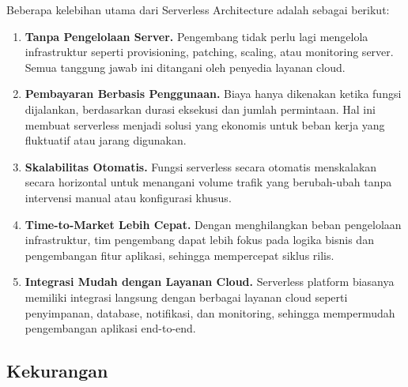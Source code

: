 Beberapa kelebihan utama dari Serverless Architecture adalah sebagai berikut:
\begin{enumerate}
	\item \textbf{Tanpa Pengelolaan Server.} Pengembang tidak perlu lagi mengelola infrastruktur seperti provisioning, patching, scaling, atau monitoring server. Semua tanggung jawab ini ditangani oleh penyedia layanan cloud.
	
	\item \textbf{Pembayaran Berbasis Penggunaan.} Biaya hanya dikenakan ketika fungsi dijalankan, berdasarkan durasi eksekusi dan jumlah permintaan. Hal ini membuat serverless menjadi solusi yang ekonomis untuk beban kerja yang fluktuatif atau jarang digunakan.
	
	\item \textbf{Skalabilitas Otomatis.} Fungsi serverless secara otomatis menskalakan secara horizontal untuk menangani volume trafik yang berubah-ubah tanpa intervensi manual atau konfigurasi khusus.
	
	\item \textbf{Time-to-Market Lebih Cepat.} Dengan menghilangkan beban pengelolaan infrastruktur, tim pengembang dapat lebih fokus pada logika bisnis dan pengembangan fitur aplikasi, sehingga mempercepat siklus rilis.
	
	\item \textbf{Integrasi Mudah dengan Layanan Cloud.} Serverless platform biasanya memiliki integrasi langsung dengan berbagai layanan cloud seperti penyimpanan, database, notifikasi, dan monitoring, sehingga mempermudah pengembangan aplikasi end-to-end.
\end{enumerate}

\subsection{Kekurangan}

